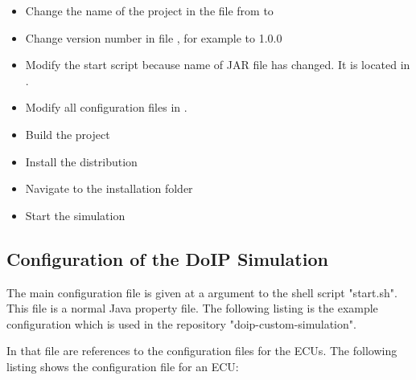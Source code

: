 \documentclass[a4paper]{doipdoc}
\begin{document}
\begin{itemize}
			\item Change the name of the project in the file 
			 from
			 to 

			\item Change version number in file 
			, for example to 1.0.0

			\item Modify the start script because name of JAR file has changed.
			It is located in .

			\item Modify all configuration files in .

			\item Build the project


			\item Install the distribution


			\item Navigate to the installation folder


			\item Start the simulation


		\end{itemize}

	\subsection{Configuration of the DoIP Simulation}
		
		The main configuration file is given at a argument to the shell script
		"start.sh". This file is a normal Java property file. The following 
		listing is the example configuration which is used in the repository
		"doip-custom-simulation".

		

		In that file are references to the configuration files for the ECUs.
		The following listing shows the configuration file for an ECU:
\end{document}
